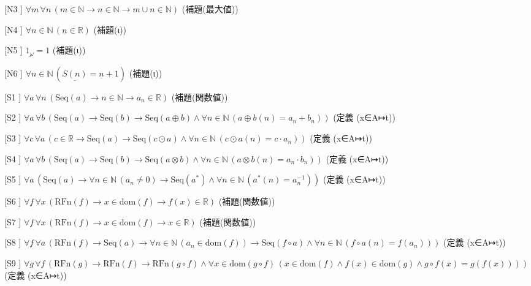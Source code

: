 \begin{registrylist}
\item[[N3]] $\forall m\,\forall n\,(m \in \mathbb{N} \to n \in \mathbb{N} \to m \cup n \in \mathbb{N})$ \hfill{\footnotesize(補題(最大値))}
\item[[N4]] $\forall n \in \mathbb{N}\,(\underline{n} \in \mathbb{R})$ \hfill{\footnotesize(補題(ι))}
\item[[N5]] $\underline{1_{\omega}} = 1$ \hfill{\footnotesize(補題(ι))}
\item[[N6]] $\forall n \in \mathbb{N}\,(\underline{S(n)} = \underline{n} + 1)$ \hfill{\footnotesize(補題(ι))}
\item[[S1]] $\forall a\,\forall n\,(\mathrm{Seq}(a) \to n \in \mathbb{N} \to a_{n} \in \mathbb{R})$ \hfill{\footnotesize(補題(関数値))}
\item[[S2]] $\forall a\,\forall b\,(\mathrm{Seq}(a) \to \mathrm{Seq}(b) \to \mathrm{Seq}(a \oplus b) \land \forall n \in \mathbb{N}\,(a \oplus b(n) = a_{n} + b_{n}))$ \hfill{\footnotesize(定義 (x∈A↦t))}
\item[[S3]] $\forall c\,\forall a\,(c \in \mathbb{R} \to \mathrm{Seq}(a) \to \mathrm{Seq}(c \odot a) \land \forall n \in \mathbb{N}\,(c \odot a(n) = c \cdot a_{n}))$ \hfill{\footnotesize(定義 (x∈A↦t))}
\item[[S4]] $\forall a\,\forall b\,(\mathrm{Seq}(a) \to \mathrm{Seq}(b) \to \mathrm{Seq}(a \otimes b) \land \forall n \in \mathbb{N}\,(a \otimes b(n) = a_{n} \cdot b_{n}))$ \hfill{\footnotesize(定義 (x∈A↦t))}
\item[[S5]] $\forall a\,(\mathrm{Seq}(a) \to \forall n \in \mathbb{N}\,(a_{n} \neq 0) \to \mathrm{Seq}(a^{\ast}) \land \forall n \in \mathbb{N}\,(a^{\ast}(n) = a_{n}^{-1}))$ \hfill{\footnotesize(定義 (x∈A↦t))}
\item[[S6]] $\forall f\,\forall x\,(\mathrm{RFn}(f) \to x \in \mathrm{dom}(f) \to f(x) \in \mathbb{R})$ \hfill{\footnotesize(補題(関数値))}
\item[[S7]] $\forall f\,\forall x\,(\mathrm{RFn}(f) \to x \in \mathrm{dom}(f) \to x \in \mathbb{R})$ \hfill{\footnotesize(補題(関数値))}
\item[[S8]] $\forall f\,\forall a\,(\mathrm{RFn}(f) \to \mathrm{Seq}(a) \to \forall n \in \mathbb{N}\,(a_{n} \in \mathrm{dom}(f)) \to \mathrm{Seq}(f \circ a) \land \forall n \in \mathbb{N}\,(f \circ a(n) = f(a_{n})))$ \hfill{\footnotesize(定義 (x∈A↦t))}
\item[[S9]] $\forall g\,\forall f\,(\mathrm{RFn}(g) \to \mathrm{RFn}(f) \to \mathrm{RFn}(g \circ f) \land \forall x \in \mathrm{dom}(g \circ f)\,(x \in \mathrm{dom}(f) \land f(x) \in \mathrm{dom}(g) \land g \circ f(x) = g(f(x))))$ \hfill{\footnotesize(定義 (x∈A↦t))}

\end{registrylist}
